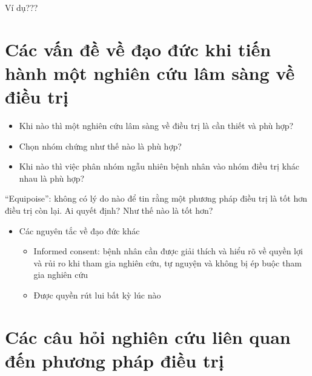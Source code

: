 \documentclass[
]{book}
\providecommand{\tightlist}{%
  \setlength{\itemsep}{0pt}\setlength{\parskip}{0pt}}
\begin{document}
Ví dụ???

\hypertarget{cuxe1c-vux1ea5n-ux111ux1ec1-vux1ec1-ux111ux1ea1o-ux111ux1ee9c-khi-tiux1ebfn-huxe0nh-mux1ed9t-nghiuxean-cux1ee9u-luxe2m-suxe0ng-vux1ec1-ux111iux1ec1u-trux1ecb}{%
\section{Các vấn đề về đạo đức khi tiến hành một nghiên cứu lâm sàng về điều trị}\label{cuxe1c-vux1ea5n-ux111ux1ec1-vux1ec1-ux111ux1ea1o-ux111ux1ee9c-khi-tiux1ebfn-huxe0nh-mux1ed9t-nghiuxean-cux1ee9u-luxe2m-suxe0ng-vux1ec1-ux111iux1ec1u-trux1ecb}}

\begin{itemize}
\item
  Khi nào thì một nghiên cứu lâm sàng về điều trị là cần thiết và phù hợp?
\item
  Chọn nhóm chứng như thế nào là phù hợp?
\item
  Khi nào thì việc phân nhóm ngẫu nhiên bệnh nhân vào nhóm điều trị khác nhau là phù hợp?
\end{itemize}

``Equipoise'': không có lý do nào để tin rằng một phương pháp điều trị là tốt hơn điều trị còn lại. Ai quyết định? Như thế nào là tốt hơn?

\begin{itemize}
\tightlist
\item
  Các nguyên tắc về đạo đức khác

  \begin{itemize}
  \tightlist
  \item
    Informed consent: bệnh nhân cần được giải thích và hiểu rõ về quyền lợi và rủi ro khi tham gia nghiên cứu, tự nguyện và không bị ép buộc tham gia nghiên cứu\\
  \item
    Được quyền rút lui bất kỳ lúc nào
  \end{itemize}
\end{itemize}

\hypertarget{cuxe1c-cuxe2u-hux1ecfi-nghiuxean-cux1ee9u-liuxean-quan-ux111ux1ebfn-phux1b0ux1a1ng-phuxe1p-ux111iux1ec1u-trux1ecb}{%
\section{Các câu hỏi nghiên cứu liên quan đến phương pháp điều trị}\label{cuxe1c-cuxe2u-hux1ecfi-nghiuxean-cux1ee9u-liuxean-quan-ux111ux1ebfn-phux1b0ux1a1ng-phuxe1p-ux111iux1ec1u-trux1ecb}}
\end{document}
